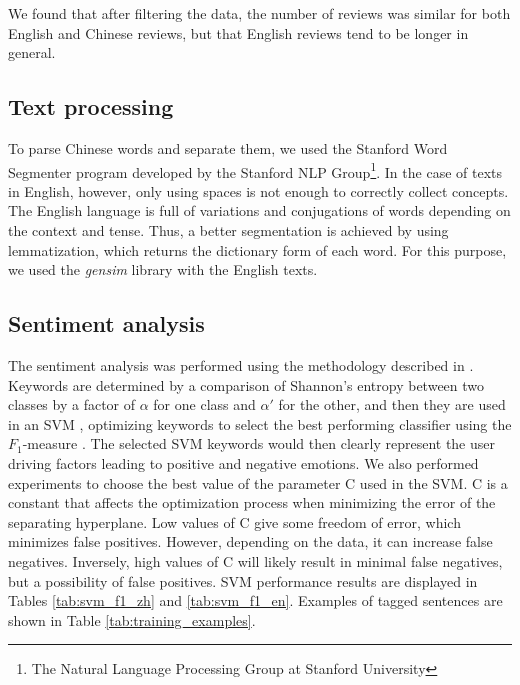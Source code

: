 \documentclass[smallextended,natbib]{svjour3}       %
\begin{document}
    We found that after filtering the data, the number of reviews was similar for both English and Chinese reviews, but that English reviews tend to be longer in general.

  \subsection{Text processing}\label{textprocessing}

    To parse Chinese words and separate them, we used the Stanford Word Segmenter \cite[][]{chang2008} program developed by the Stanford NLP Group\footnote{\label{stanfordnlp}The Natural Language Processing Group at Stanford University}. In the case of texts in English, however, only using spaces is not enough to correctly collect concepts. The English language is full of variations and conjugations of words depending on the context and tense. Thus, a better segmentation is achieved by using lemmatization, which returns the dictionary form of each word. For this purpose, we used the \textit{gensim} library with the English texts.

  \subsection{Sentiment analysis}\label{sentimentanalysis}

    The sentiment analysis was performed using the methodology described in \cite{Aleman2018ICAROB}. Keywords are determined by a comparison of Shannon's entropy \cite[][]{shannon1948} between two classes by a factor of \(\alpha\) for one class and \(\alpha'\) for the other, and then they are used in an SVM \cite[][]{cortes1995}, optimizing keywords to select the best performing classifier using the \(F_1\)-measure \cite{powers2011}. The selected SVM keywords would then clearly represent the user driving factors leading to positive and negative emotions. We also performed experiments to choose the best value of the parameter C used in the SVM. C is a constant that affects the optimization process when minimizing the error of the separating hyperplane. Low values of C give some freedom of error, which minimizes false positives. However, depending on the data, it can increase false negatives. Inversely, high values of C will likely result in minimal false negatives, but a possibility of false positives. SVM performance results are displayed in  Tables \ref{tab:svm_f1_zh} and \ref{tab:svm_f1_en}. Examples of tagged sentences are shown in Table \ref{tab:training_examples}. 
\end{document}
